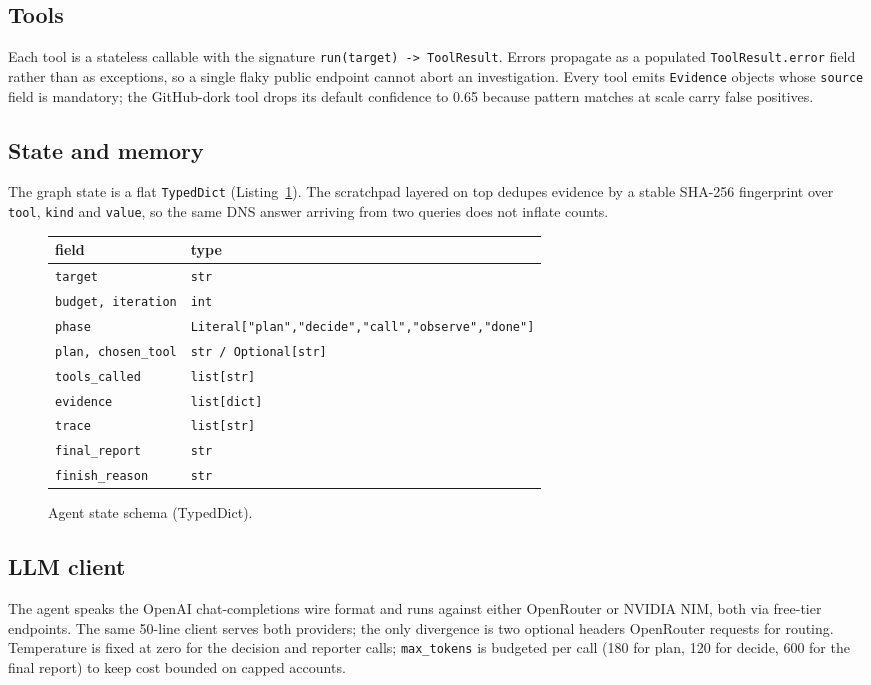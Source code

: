 \documentclass[conference]{IEEEtran}
\begin{document}
\subsection{Tools}
Each tool is a stateless callable with the signature
\verb|run(target) -> ToolResult|. Errors propagate as a populated
\verb|ToolResult.error| field rather than as exceptions, so a single
flaky public endpoint cannot abort an investigation. Every tool emits
\verb|Evidence| objects whose \verb|source| field is mandatory; the
GitHub-dork tool drops its default confidence to 0.65 because pattern
matches at scale carry false positives.

\subsection{State and memory}
The graph state is a flat \verb|TypedDict| (Listing~\ref{lst:state}).
The scratchpad layered on top dedupes evidence by a stable SHA-256
fingerprint over \verb|tool|, \verb|kind| and \verb|value|, so the same
DNS answer arriving from two queries does not inflate counts.

\begin{figure}[t]
\centering
\renewcommand{\arraystretch}{1.18}
\begin{tabular}{ll}
\toprule
\textbf{field} & \textbf{type} \\
\midrule
\texttt{target}             & \texttt{str} \\
\texttt{budget, iteration}  & \texttt{int} \\
\texttt{phase}              & \texttt{Literal["plan","decide","call","observe","done"]} \\
\texttt{plan, chosen\_tool} & \texttt{str / Optional[str]} \\
\texttt{tools\_called}      & \texttt{list[str]} \\
\texttt{evidence}           & \texttt{list[dict]} \\
\texttt{trace}              & \texttt{list[str]} \\
\texttt{final\_report}      & \texttt{str} \\
\texttt{finish\_reason}     & \texttt{str} \\
\bottomrule
\end{tabular}
\caption{Agent state schema (TypedDict).}
\label{lst:state}
\end{figure}

\subsection{LLM client}
The agent speaks the OpenAI chat-completions wire format and runs against
either OpenRouter or NVIDIA NIM, both via free-tier endpoints. The same
50-line client serves both providers; the only divergence is two
optional headers OpenRouter requests for routing. Temperature is fixed
at zero for the decision and reporter calls; \verb|max_tokens| is
budgeted per call (180 for plan, 120 for decide, 600 for the final
report) to keep cost bounded on capped accounts.
\end{document}
